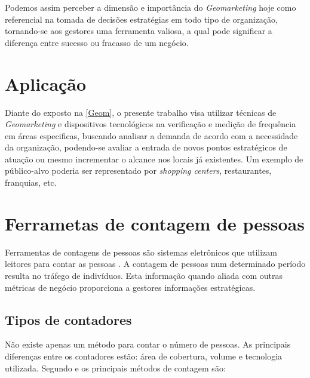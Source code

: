 Podemos assim perceber a dimensão e importância do \emph{Geomarketing} hoje como
referencial na tomada de decisões estratégias em todo tipo de organização,
tornando-se aos gestores uma ferramenta valiosa,  a qual pode significar a
diferença entre sucesso ou fracasso de um negócio.

\section{Aplicação}
Diante do exposto na \autoref{Geom}, o presente trabalho
visa utilizar técnicas de \emph{Geomarketing} e dispositivos tecnológicos na
verificação e medição de frequência em áreas especificas, buscando analisar a
demanda de acordo com a necessidade da organização, podendo-se avaliar a entrada
de novos pontos estratégicos de atuação ou mesmo incrementar o alcance nos
locais já existentes. Um exemplo de público-alvo poderia ser representado por
\emph{shopping centers}, restaurantes, franquias, etc.

\section{Ferrametas de contagem de pessoas}
Ferramentas de contagens de pessoas
são sistemas eletrônicos que utilizam leitores para contar as pessoas
\cite{trafsysdef}. A contagem de pessoas num determinado período resulta no
tráfego de indivíduos. Esta informação quando aliada com outras métricas de
negócio proporciona a gestores informações estratégicas.

\subsection{Tipos de contadores}
Não existe apenas um método para contar o número de pessoas. As principais
diferenças entre os contadores estão: área de cobertura, volume e tecnologia
utilizada. Segundo  e  os principais métodos de
contagem são:


